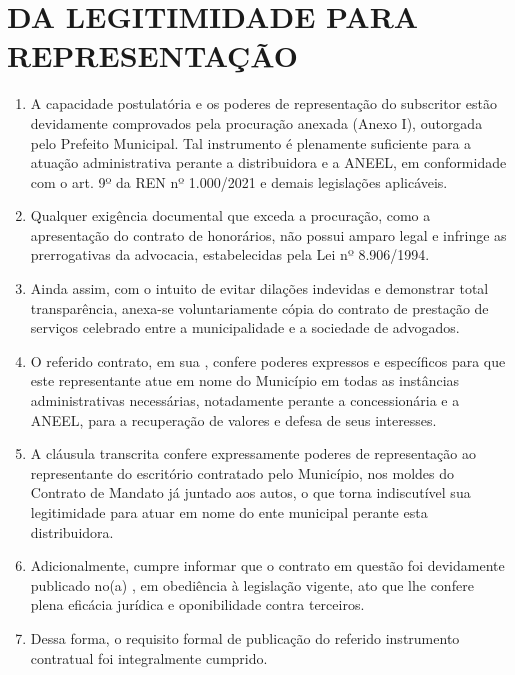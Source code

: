 \section{DA LEGITIMIDADE PARA REPRESENTAÇÃO}

\begin{enumerate}[resume]
\item A capacidade postulatória e os poderes de representação do subscritor estão devidamente comprovados pela procuração anexada (Anexo I), outorgada pelo Prefeito Municipal. Tal instrumento é plenamente suficiente para a atuação administrativa perante a distribuidora e a ANEEL, em conformidade com o art. 9º da REN nº 1.000/2021 e demais legislações aplicáveis.
\item Qualquer exigência documental que exceda a procuração, como a apresentação do contrato de honorários, não possui amparo legal e infringe as prerrogativas da advocacia, estabelecidas pela Lei nº 8.906/1994.
\item Ainda assim, com o intuito de evitar dilações indevidas e demonstrar total transparência, anexa-se voluntariamente cópia do contrato de prestação de serviços celebrado entre a municipalidade e a sociedade de advogados.
\item O referido contrato, em sua \textbf{\Clausula{}}, confere poderes expressos e específicos para que este representante atue em nome do Município em todas as instâncias administrativas necessárias, notadamente perante a concessionária \textbf{\Concessionaria{}} e a ANEEL, para a recuperação de valores e defesa de seus interesses.
\Citacao{\CiteContrato{}}
\item A cláusula transcrita confere expressamente poderes de representação ao representante do escritório contratado pelo Município, nos moldes do Contrato de Mandato já juntado aos autos, o que torna indiscutível sua legitimidade para atuar em nome do ente municipal perante esta distribuidora.
\item Adicionalmente, cumpre informar que o contrato em questão foi devidamente publicado no(a) \textbf{\Publicacao{}}, em obediência à legislação vigente, ato que lhe confere plena eficácia jurídica e oponibilidade contra terceiros.
\item Dessa forma, o requisito formal de publicação do referido instrumento contratual foi integralmente cumprido. 
\end{enumerate}
